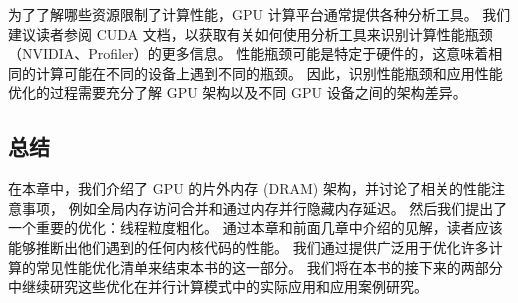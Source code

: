 为了了解哪些资源限制了计算性能，GPU 计算平台通常提供各种分析工具。 
我们建议读者参阅 CUDA 文档，以获取有关如何使用分析工具来识别计算性能瓶颈（NVIDIA、Profiler）的更多信息。 
性能瓶颈可能是特定于硬件的，这意味着相同的计算可能在不同的设备上遇到不同的瓶颈。 
因此，识别性能瓶颈和应用性能优化的过程需要充分了解 GPU 架构以及不同 GPU 设备之间的架构差异。

\subsection{总结}
在本章中，我们介绍了 GPU 的片外内存 (DRAM) 架构，并讨论了相关的性能注意事项，
例如全局内存访问合并和通过内存并行隐藏内存延迟。 然后我们提出了一个重要的优化：线程粒度粗化。 
通过本章和前面几章中介绍的见解，读者应该能够推断出他们遇到的任何内核代码的性能。 
我们通过提供广泛用于优化许多计算的常见性能优化清单来结束本书的这一部分。 
我们将在本书的接下来的两部分中继续研究这些优化在并行计算模式中的实际应用和应用案例研究。

